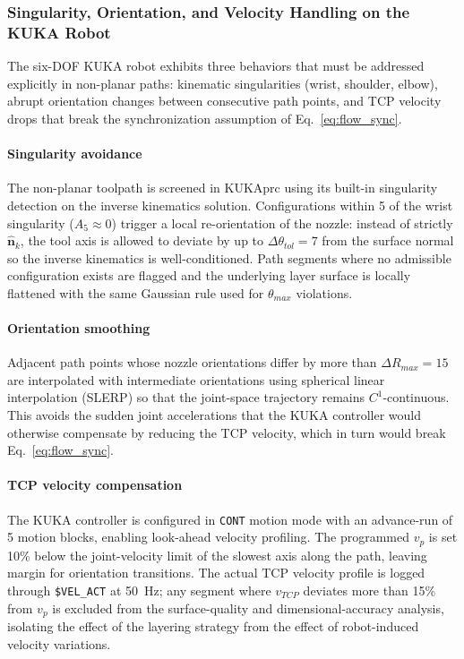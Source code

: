\documentclass[conference]{IEEEtran}
\begin{document}
\subsubsection{Singularity, Orientation, and Velocity Handling on the KUKA Robot}
\label{subsec:kuka}

The six-DOF KUKA robot exhibits three behaviors that must be addressed explicitly in non-planar paths: kinematic singularities (wrist, shoulder, elbow), abrupt orientation changes between consecutive path points, and TCP velocity drops that break the synchronization assumption of Eq.~\ref{eq:flow_sync}.

\paragraph{Singularity avoidance} The non-planar toolpath is screened in KUKA\textbar prc using its built-in singularity detection on the inverse kinematics solution. Configurations within 5\textdegree{} of the wrist singularity ($A_5 \approx 0$) trigger a local re-orientation of the nozzle: instead of strictly $\hat{\mathbf{n}}_k$, the tool axis is allowed to deviate by up to $\Delta\theta_{tol} = 7$\textdegree{} from the surface normal so the inverse kinematics is well-conditioned. Path segments where no admissible configuration exists are flagged and the underlying layer surface is locally flattened with the same Gaussian rule used for $\theta_{max}$ violations.

\paragraph{Orientation smoothing} Adjacent path points whose nozzle orientations differ by more than $\Delta R_{max} = 15$\textdegree{} are interpolated with intermediate orientations using spherical linear interpolation (SLERP) so that the joint-space trajectory remains $C^1$-continuous. This avoids the sudden joint accelerations that the KUKA controller would otherwise compensate by reducing the TCP velocity, which in turn would break Eq.~\ref{eq:flow_sync}.

\paragraph{TCP velocity compensation} The KUKA controller is configured in \texttt{CONT} motion mode with an advance-run of 5 motion blocks, enabling look-ahead velocity profiling. The programmed $v_p$ is set 10\% below the joint-velocity limit of the slowest axis along the path, leaving margin for orientation transitions. The actual TCP velocity profile is logged through \texttt{\$VEL\_ACT} at 50~Hz; any segment where $v_{TCP}$ deviates more than 15\% from $v_p$ is excluded from the surface-quality and dimensional-accuracy analysis, isolating the effect of the layering strategy from the effect of robot-induced velocity variations.
\end{document}
